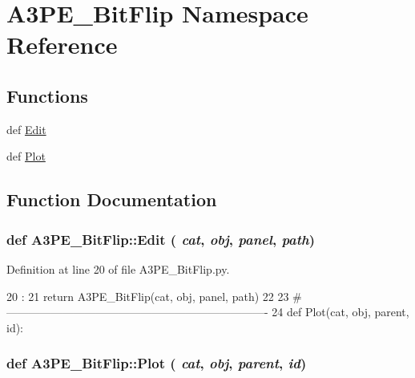 \hypertarget{namespaceA3PE__BitFlip}{
\section{A3PE\_\-BitFlip Namespace Reference}
\label{namespaceA3PE__BitFlip}
}
\subsection*{Functions}
\begin{DoxyCompactItemize}
\item 
def \hyperlink{namespaceA3PE__BitFlip_affa2550d72dbb6f0e77797514a3ad3ec}{Edit}
\item 
def \hyperlink{namespaceA3PE__BitFlip_a9a0ff72425d94852dc8376b1575bb1be}{Plot}
\end{DoxyCompactItemize}


\subsection{Function Documentation}
\hypertarget{namespaceA3PE__BitFlip_affa2550d72dbb6f0e77797514a3ad3ec}{
\subsubsection[{Edit}]{\setlength{\rightskip}{0pt plus 5cm}def A3PE\_\-BitFlip::Edit ( {\em cat}, \/   {\em obj}, \/   {\em panel}, \/   {\em path})}}
\label{namespaceA3PE__BitFlip_affa2550d72dbb6f0e77797514a3ad3ec}


Definition at line 20 of file A3PE\_\-BitFlip.py.


\begin{DoxyCode}
20                                 :
21     return A3PE_BitFlip(cat, obj, panel, path)
22 
23 #----------------------------------------------------------------------
24 
def Plot(cat, obj, parent, id):
\end{DoxyCode}
\hypertarget{namespaceA3PE__BitFlip_a9a0ff72425d94852dc8376b1575bb1be}{
\subsubsection[{Plot}]{\setlength{\rightskip}{0pt plus 5cm}def A3PE\_\-BitFlip::Plot ( {\em cat}, \/   {\em obj}, \/   {\em parent}, \/   {\em id})}}
\label{namespaceA3PE__BitFlip_a9a0ff72425d94852dc8376b1575bb1be}


